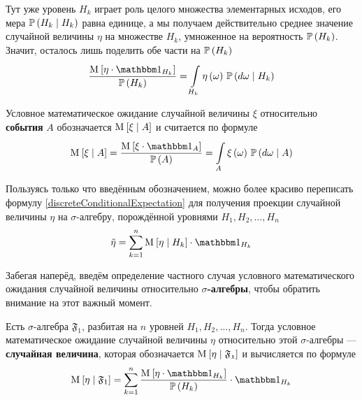 Тут уже уровень $H_k$ играет роль целого множества элементарных исходов,
его мера $\mathbb{P}\left( H_k \mid H_k \right)$ равна единице,
а мы получаем действительно среднее значение случайной величины $\eta$
на множестве $H_k$, умноженное на вероятность $\mathbb{P}\left( H_k \right)$.
Значит, осталось лишь поделить обе части на $\mathbb{P}\left( H_k \right)$
$$\frac{\Mean{ \eta \cdot \indicatorof{H_k} }}{\probability{H_k}}
        = \integrall{H_k}{\probability{d\omega \mid H_k}}{
            \eta\left( \omega \right)}$$

\begin{definition}
    \label{eventConditionalExpectationDefinition}
    Условное математическое ожидание случайной величины $\xi$
    относительно \textbf{события} $A$ \cite[стр.~68]{BorovkovPT}
    обозначается $\mathrm{M}_{} \left[ \xi \mid A \right]$ и считается по формуле
    $$\Mean{\xi \mid A}
        = \frac{\Mean{\xi \cdot \indicatorof{A}}}{\probability{A}}
            = \integrall{A}{\probability{d\omega \mid A}}{
                \xi\left( \omega \right)}$$
\end{definition}

Пользуясь только что введённым обозначением,
можно более красиво переписать формулу \eqref{discreteConditionalExpectation}
для получения проекции случайной величины $\eta$ на $\sigma$-алгебру,
порождённой уровнями $H_1, H_2, \dots, H_n$ 
$$\tilde{\eta}
    = \sum_{k=1}^n \Mean{ \eta \mid H_k } \cdot \indicatorof{H_k}$$

Забегая наперёд,
введём определение частного случая условного математического ожидания
случайной величины относительно \textbf{$\sigma$-алгебры},
чтобы обратить внимание на этот важный момент.

\begin{definition}
    \label{discreteConditionalExpectationDefinition}
    Есть $\sigma$-алгебра $\mathfrak{F}_1$,
    разбитая на $n$ уровней $H_1, H_2, \dots, H_n$.
    Тогда условное математическое ожидание случайной величины
    $\eta$ относительно этой $\sigma$-алгебры --- \textbf{случайная величина},
    которая обозначается $\mathrm{M}_{} \left[  \eta \mid \mathfrak{F_1}  \right]$
    и вычисляется по формуле
    $$\Mean{ \eta \mid \mathfrak{F}_1 }
        = \sum_{k=1}^n
            \frac{\Mean{ \eta \cdot \indicatorof{H_k} }}
                {\probability{H_k}}
            \cdot \indicatorof{H_k}$$
\end{definition}

